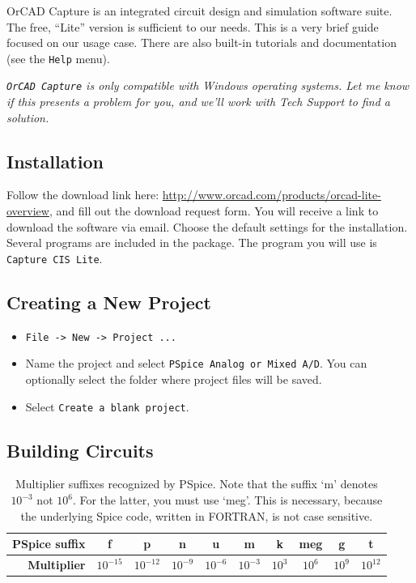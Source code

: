 \documentclass[11pt]{article}
\begin{document}
OrCAD Capture is an integrated circuit design and simulation software
suite. The free, ``Lite'' version is sufficient to our needs. This is
a very brief guide focused on our usage case. There are also built-in
tutorials and documentation (see the \texttt{Help} menu).

\emph{\texttt{OrCAD Capture} is only compatible with Windows
  operating systems. Let me know if this presents a problem for you,
  and we'll work with Tech Support to find a solution.}

\subsection{Installation}

Follow the download link here:
\url{http://www.orcad.com/products/orcad-lite-overview}, and fill out
the download request form. You will receive a link to download the
software via email. Choose the default settings for the
installation. Several programs are included in the package. The
program you will use is \texttt{Capture CIS Lite}. 

\subsection{Creating a New Project}

\begin{itemize}
\item \texttt{File -> New -> Project ...}

\item Name the project and select \texttt{PSpice Analog or Mixed
  A/D}. You can optionally select the folder where project files will
  be saved.

\item Select \texttt{Create a blank project}.
\end{itemize}

\subsection{Building Circuits}

\begin{table}
  \begin{center}
    \begin{tabular}{|r|c|c|c|c|c|c|c|c|c|}\hline
      \textbf{PSpice suffix}
      & f         & p         & n
      & u         & m         & k
      & meg       & g         & t        \\\hline
      \textbf{Multiplier}
      & $10^{-15}$ & $10^{-12}$ & $10^{-9}$
      & $10^{-6}$ & $10^{-3}$  & $10^{3}$
      & $10^{6}$   & $10^{9}$  & $10^{12}$ \\\hline
    \end{tabular}
    \caption{Multiplier suffixes recognized by PSpice. Note that the
      suffix `m' denotes $10^{-3}$ not $10^{6}$. For the latter, you
      must use `meg'. This is necessary, because the underlying Spice
      code, written in FORTRAN, is not case sensitive.} 
    \label{tab:pspicemult}
  \end{center}
\end{table}
\end{document}
